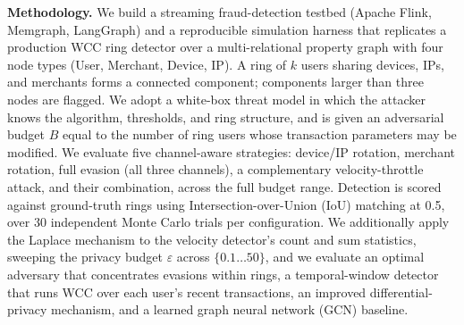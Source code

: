 \documentclass[12pt,a4paper]{article}
\begin{document}
\textbf{Methodology.} We build a streaming fraud-detection testbed (Apache
Flink, Memgraph, LangGraph) and a reproducible simulation harness that
replicates a production WCC ring detector over a multi-relational property graph
with four node types (User, Merchant, Device, IP). A ring of $k$ users sharing
devices, IPs, and merchants forms a connected component; components larger than
three nodes are flagged. We adopt a white-box threat model in which the attacker
knows the algorithm, thresholds, and ring structure, and is given an
adversarial budget $B$ equal to the number of ring users whose transaction
parameters may be modified. We evaluate five channel-aware strategies:
device/IP rotation, merchant rotation, full evasion (all three channels), a
complementary velocity-throttle attack, and their combination, across the full
budget range. Detection is scored against ground-truth rings using
Intersection-over-Union (IoU) matching at 0.5, over 30 independent Monte Carlo
trials per configuration. We additionally apply the Laplace mechanism to the
velocity detector's count and sum statistics, sweeping the privacy budget
$\varepsilon$ across $\{0.1 \ldots 50\}$, and we evaluate an optimal adversary
that concentrates evasions within rings, a temporal-window detector that runs
WCC over each user's recent transactions, an improved differential-privacy
mechanism, and a learned graph neural network (GCN) baseline.
\end{document}
